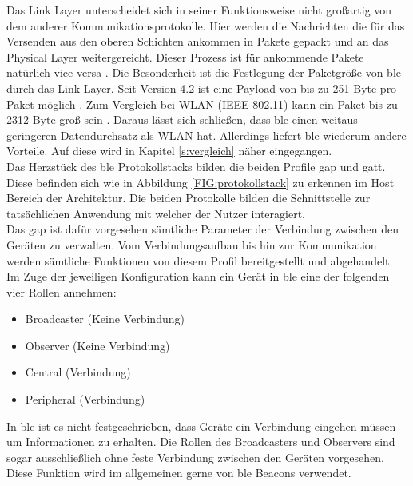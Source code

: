 \noindent Das Link Layer unterscheidet sich in seiner Funktionsweise nicht großartig von dem anderer Kommunikationsprotokolle. Hier werden die Nachrichten die für das  Versenden aus den oberen Schichten ankommen in Pakete gepackt und an das Physical Layer weitergereicht. Dieser Prozess ist für ankommende Pakete natürlich vice versa \cite[Seit 194]{Tanenbaum14:CN}. Die Besonderheit ist die Festlegung der Paketgröße von \ac{ble} durch das Link Layer. Seit Version 4.2 ist eine Payload von bis zu 251 Byte pro Paket möglich \cite{Gupta20:WWW}. Zum Vergleich bei WLAN (IEEE 802.11) kann ein Paket bis zu 2312 Byte groß sein \cite[Seite 233]{Gessler15:WNN}. Daraus lässt sich schließen, dass \ac{ble} einen weitaus geringeren Datendurchsatz als WLAN hat. Allerdings liefert \ac{ble} wiederum andere Vorteile. Auf diese wird in Kapitel \ref{s:vergleich} näher eingegangen.\\

\noindent Das Herzstück des \ac{ble} Protokollstacks bilden die beiden Profile \ac{gap} und \ac{gatt}. Diese befinden sich wie in Abbildung \ref{FIG:protokollstack} zu erkennen im Host Bereich der Architektur. Die beiden Protokolle bilden die Schnittstelle zur tatsächlichen Anwendung mit welcher der Nutzer interagiert.\\

\noindent Das \ac{gap} ist dafür vorgesehen sämtliche Parameter der Verbindung zwischen den Geräten zu verwalten. Vom Verbindungsaufbau bis hin zur Kommunikation werden sämtliche Funktionen von diesem Profil bereitgestellt und abgehandelt.\\

\noindent Im Zuge der jeweiligen Konfiguration kann ein Gerät in \ac{ble} eine der folgenden vier Rollen annehmen:
\begin{itemize}
	\item{Broadcaster (Keine Verbindung)}
	\item{Observer (Keine Verbindung)}
	\item{Central (Verbindung)}
	\item{Peripheral (Verbindung)}
\end{itemize}   

\noindent In \ac{ble} ist es nicht festgeschrieben, dass Geräte ein Verbindung eingehen müssen um Informationen zu erhalten. Die Rollen des Broadcasters und Observers sind sogar ausschließlich ohne feste Verbindung zwischen den Geräten vorgesehen. Diese Funktion wird im allgemeinen gerne von \ac{ble} Beacons verwendet.\\

